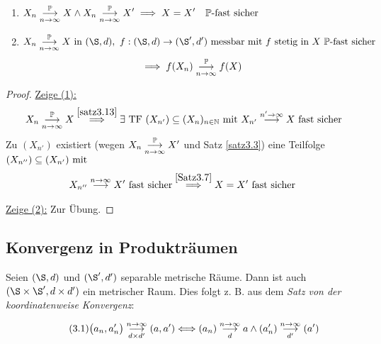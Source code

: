 \begin{korollar}\label{Korollar3.14}\
\begin{enumerate}[label=(\arabic*)]
\item $\begin{aligned}
X_n
\stackrelnew{n\to\infty}{\P}{\longrightarrow}
X\wedge X_n
\stackrelnew{n\to\infty}{\P}{\longrightarrow}
X'
\implies X=X'\quad\P\text{-fast sicher}
\end{aligned}$
\item $\begin{aligned}
X_n
\stackrelnew{n\to\infty}{\P}{\longrightarrow}
X\text{ in }(\S,d),~f:(\S,d)\to(\S',d')\text{ messbar mit $f$ stetig in $X$ $\P$-fast sicher }
\end{aligned}$
\begin{align*}
\implies f(X_n)
\stackrelnew{n\to\infty}{\P}{\longrightarrow}
f(X)
\end{align*}
\end{enumerate}
\end{korollar}
\begin{proof}
\underline{Zeige (1):}
\begin{align*}
X_n
\stackrelnew{n\to\infty}{\P}{\longrightarrow}
X
\stackrel{\ref{satz3.13}}{\implies}
\exists\text{ TF }(X_{n'})\subseteq(X_n)_{n\in\N}\mit X_{n'}
\stackrel{n'\to\infty}{\longrightarrow}
X\text{ fast sicher}
\end{align*}
Zu $(X_{n'})$ existiert (wegen $X_n\stackrelnew{n\to\infty}{\P}{\longrightarrow} X'$ und Satz \ref{satz3.3}) eine Teilfolge $(X_{n''})\subseteq(X_{n'})\mit$
\begin{align*}
X_{n''}
\stackrel{n\to\infty}{\longrightarrow} X'\text{ fast sicher}
\stackrel{\ref{Satz3.7}}{\implies}
X=X'\text{ fast sicher }
\end{align*}

\underline{Zeige (2):} Zur Übung.
\end{proof}

\subsection*{Konvergenz in Produkträumen} %
Seien $(\S,d)$ und $(\S',d')$ separable metrische Räume. Dann ist auch $(\S\times\S',d\times d')$ ein metrischer Raum. Dies folgt z. B. aus dem \textit{Satz von der koordinatenweise Konvergenz}:

\begin{align}\label{eq3.1KoordinatenweissKonvergenz}\tag{3.1}
\big(a_n,a_n'\big)
\stackrelnew{d\times d'}{n\to\infty}{\longrightarrow}
(a,a')
\Longleftrightarrow
(a_n)
\stackrelnew{d}{n\to\infty}{\longrightarrow}
a
\wedge
(a_n')
\stackrelnew{d'}{n\to\infty}{\longrightarrow}
(a')
\end{align}

